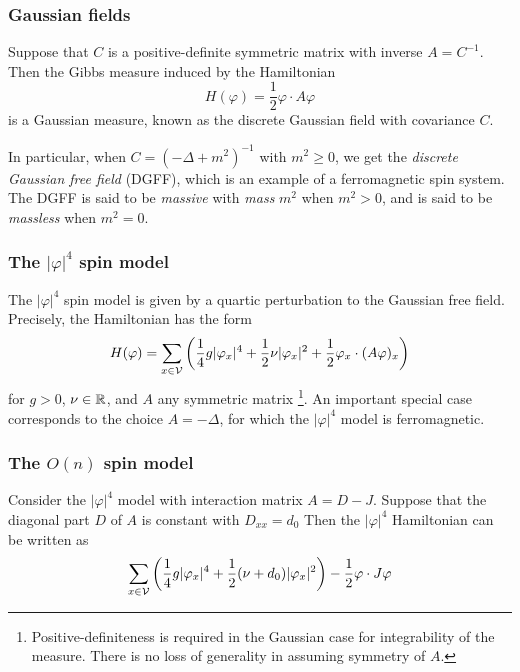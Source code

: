 \subsubsection{Gaussian fields}

Suppose that $C$ is a positive-definite symmetric matrix with inverse $A = C^{-1}$.
Then the Gibbs measure induced by the Hamiltonian
\begin{equation}
H(\varphi) = \frac{1}{2} \varphi \cdot A \varphi
\end{equation}
is a Gaussian measure, known as the discrete Gaussian field with covariance $C$.

In particular, when $C = (-\Delta + m^2)^{-1}$ with $m^2 \ge 0$, we get the \emph{discrete Gaussian
free field} (DGFF), which is an example of a ferromagnetic spin system. The DGFF is said to be
\emph{massive} with \emph{mass} $m^2$ when $m^2 > 0$, and is said to be \emph{massless} when $m^2 = 0$.


\subsubsection{The $|\varphi|^4$ spin model}

The $|\varphi|^4$ spin model is given by a quartic perturbation to the Gaussian free field.
Precisely, the Hamiltonian has the form
\begin{equation}
H(\varphi)
  =
\sum_{x\in\mathcal{V}}
\left(
  \frac{1}{4} g |\varphi_x|^4
    +
  \frac{1}{2} \nu |\varphi_x|^2
    +
  \frac{1}{2} \varphi_x \cdot (A \varphi)_x
\right)
\end{equation}
for $g > 0$, $\nu\in{\mathbb R}$, and $A$ any symmetric
matrix \footnote{Positive-definiteness is required in the Gaussian case
for integrability of the measure. There is no loss of generality in assuming
symmetry of $A$.}.
An important special case corresponds to the choice $A = -\Delta$, for which
the $|\varphi|^4$ model is ferromagnetic.


\subsubsection{The $O(n)$ spin model}

Consider the $|\varphi|^4$ model with interaction matrix $A = D - J$.
Suppose that the
diagonal part $D$ of $A$ is constant with $D_{xx} = d_0$
Then the $|\varphi|^4$ Hamiltonian can be written as
\begin{equation}
\sum_{x\in\mathcal{V}}
\left(
  \frac{1}{4} g |\varphi_x|^4
    +
  \frac{1}{2} (\nu + d_0) |\varphi_x|^2
\right)
  -
\frac{1}{2} \varphi \cdot J \varphi
\end{equation}

